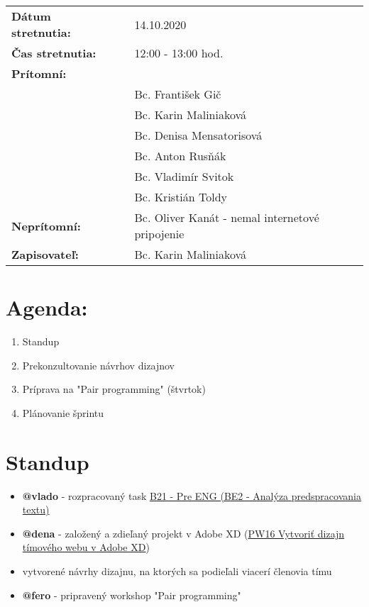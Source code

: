 \documentclass{article}
\begin{document}
    

    \begin{table}[h]
        \begin{tabular}{lllll}
            \multicolumn{3}{l}{\textbf{Dátum stretnutia:}} & & 14.10.2020 \\
            \multicolumn{3}{l}{\textbf{Čas stretnutia:}} & & 12:00 - 13:00 hod. \\
            \multicolumn{3}{l}{\textbf{Prítomní:}} \\
            & & & & Bc. František Gič  \\
            & & & & Bc. Karin Maliniaková \\
            & & & & Bc. Denisa Mensatorisová \\
            & & & & Bc. Anton Rusňák \\
            & & & & Bc. Vladimír Svitok \\
            & & & & Bc. Kristián Toldy \\
            \multicolumn{3}{l}{\textbf{Neprítomní:}} & & Bc. Oliver Kanát - nemal internetové pripojenie\\
            \multicolumn{3}{l}{\textbf{Zapisovateľ:}} & & Bc. Karin Maliniaková \\
        \end{tabular}
        \label{tab:grades}
    \end{table}

    \section*{Agenda:}

    \begin{enumerate}
        \item Standup
        \item Prekonzultovanie návrhov dizajnov
        \item Príprava na "Pair programming" (štvrtok)
        \item Plánovanie šprintu
    \end{enumerate}

    \section*{Standup}

    \begin{itemize}
        \item \textbf {@vlado} - rozpracovaný task \underline {B21 - Pre ENG (BE2 - Analýza predspracovania textu)}
        \item \textbf {@dena} - založený a zdieľaný projekt v Adobe XD (\underline {PW16 Vytvoriť dizajn tímového webu v Adobe XD})
        \item vytvorené návrhy dizajnu, na ktorých sa podieľali viacerí členovia tímu
        \item \textbf {@fero} - pripravený workshop "Pair programming"    
    \end{itemize}
\end{document}
